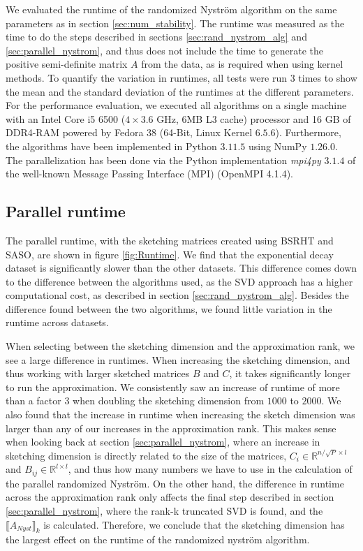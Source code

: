 \documentclass{article}
\theoremstyle{definition}
\begin{document}
We evaluated the runtime of the randomized Nyström algorithm on the same parameters as in section \ref{sec:num_stability}. The runtime was measured as the time to do the steps described in sections \ref{sec:rand_nystrom_alg} and \ref{sec:parallel_nystrom}, and thus does not include the time to generate the positive semi-definite matrix $A$ from the data, as is required when using kernel methods. To quantify the variation in runtimes, all tests were run 3 times to show the mean and the standard deviation of the runtimes at the different parameters. For the performance evaluation, we executed all algorithms on a single machine with an Intel Core i5 6500 ($4 \times 3.6$ GHz, $6$MB L3 cache) processor and 16 GB of DDR4-RAM powered by Fedora 38 (64-Bit, Linux Kernel $6.5.6$). Furthermore, the algorithms have been implemented in Python $3.11.5$ using NumPy $1.26.0$. The parallelization has been done via the Python implementation \textit{mpi4py} $3.1.4$ of the well-known Message Passing Interface (MPI) (OpenMPI 4.1.4).\newline


\subsection{Parallel runtime}
The parallel runtime, with the sketching matrices created using BSRHT and SASO, are shown in figure \ref{fig:Runtime}. We find that the exponential decay dataset is significantly slower than the other datasets. This difference comes down to the difference between the algorithms used, as the SVD approach has a higher computational cost, as described in section \ref{sec:rand_nystrom_alg}. Besides the difference found between the two algorithms, we found little variation in the runtime across datasets. \newline

When selecting between the sketching dimension and the approximation rank, we see a large difference in runtimes. When increasing the sketching dimension, and thus working with larger sketched matrices $B$ and $C$, it takes significantly longer to run the approximation. We consistently saw an increase of runtime of more than a factor 3 when doubling the sketching dimension from $1000$ to $2000$. We also found that the increase in runtime when increasing the sketch dimension was larger than any of our increases in the approximation rank. This makes sense when looking back at section \ref{sec:parallel_nystrom}, where an increase in sketching dimension is directly related to the size of the matrices, $C_i\in\mathbb{R}^{n/\!\sqrt{P}\times l}$ and $B_{ij}\in\mathbb{R}^{l\times l}$, and thus how many numbers we have to use in the calculation of the parallel randomized Nyström. On the other hand, the difference in runtime across the approximation rank only affects the final step described in section \ref{sec:parallel_nystrom}, where the rank-k truncated SVD is found, and the $\llbracket A_{Nyst}\rrbracket_k$ is calculated. Therefore, we conclude that the sketching dimension has the largest effect on the runtime of the randomized nyström algorithm.
\end{document}
